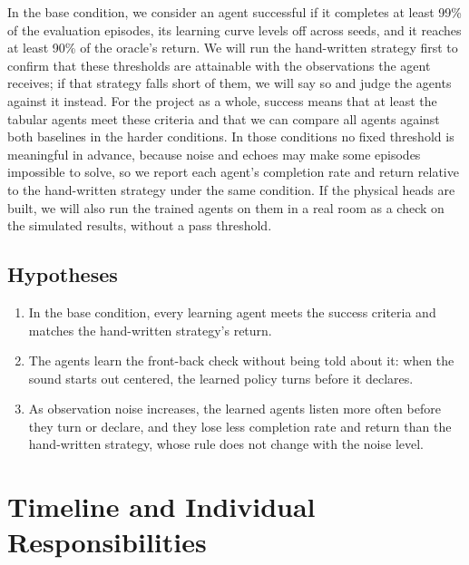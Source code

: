 \documentclass{article}
\begin{document}
In the base condition, we consider an agent successful if it completes at
least 99\% of the evaluation episodes, its learning curve levels off across
seeds, and it reaches at least 90\% of the oracle's return. We will run the
hand-written strategy first to confirm that these thresholds are attainable
with the observations the agent receives; if that strategy falls short of
them, we will say so and judge the agents against it instead. For the project
as a whole, success means that at least the tabular agents meet these criteria
and that we can compare all agents against both baselines in the harder
conditions. In those conditions no fixed threshold is meaningful in advance,
because noise and echoes may make some episodes impossible to solve, so we
report each agent's completion rate and return relative to the hand-written
strategy under the same condition. If the physical heads are built, we will
also run the trained agents on them in a real room as a check on the
simulated results, without a pass threshold.

\subsection{Hypotheses}

\begin{enumerate}
  \item In the base condition, every learning agent meets the success criteria
  and matches the hand-written strategy's return.
  \item The agents learn the front-back check without being told about it:
  when the sound starts out centered, the learned policy turns before it
  declares.
  \item As observation noise increases, the learned agents listen more often
  before they turn or declare, and they lose less completion rate and return
  than the hand-written strategy, whose rule does not change with the noise
  level.
\end{enumerate}




\section{Timeline and Individual Responsibilities}
\end{document}
